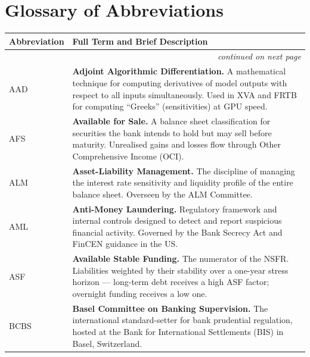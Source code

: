 \documentclass[12pt,a4paper]{article}
\begin{document}
\newpage
\section*{Glossary of Abbreviations}

\begin{longtable}{p{3.2cm} p{10.8cm}}
  \toprule
  \textbf{Abbreviation} & \textbf{Full Term and Brief Description} \\
  \midrule
  \endhead
  \midrule
  \multicolumn{2}{r}{\small\itshape continued on next page} \\
  \endfoot
  \bottomrule
  \endlastfoot

  AAD   & \textbf{Adjoint Algorithmic Differentiation.}
          A mathematical technique for computing derivatives of model outputs
          with respect to all inputs simultaneously.  Used in XVA and FRTB for
          computing ``Greeks'' (sensitivities) at GPU speed. \\[4pt]

  AFS   & \textbf{Available for Sale.}
          A balance sheet classification for securities the bank intends to
          hold but may sell before maturity.  Unrealised gains and losses flow
          through Other Comprehensive Income (OCI). \\[4pt]

  ALM   & \textbf{Asset-Liability Management.}
          The discipline of managing the interest rate sensitivity and
          liquidity profile of the entire balance sheet.  Overseen by the
          ALM Committee. \\[4pt]

  AML   & \textbf{Anti-Money Laundering.}
          Regulatory framework and internal controls designed to detect and
          report suspicious financial activity.  Governed by the Bank Secrecy
          Act and FinCEN guidance in the US. \\[4pt]

  ASF   & \textbf{Available Stable Funding.}
          The numerator of the NSFR.  Liabilities weighted by their stability
          over a one-year stress horizon --- long-term debt receives a high
          ASF factor; overnight funding receives a low one. \\[4pt]

  BCBS  & \textbf{Basel Committee on Banking Supervision.}
          The international standard-setter for bank prudential regulation,
          hosted at the Bank for International Settlements (BIS) in Basel,
          Switzerland. \\[4pt]


\end{longtable}
\end{document}
